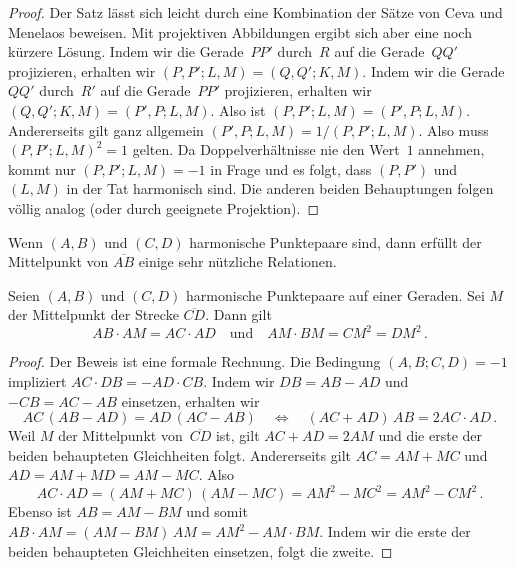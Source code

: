 \begin{proof}
	Der Satz lässt sich leicht durch eine Kombination der Sätze von Ceva und Menelaos beweisen. Mit projektiven Abbildungen ergibt sich aber eine noch kürzere Lösung. Indem wir die Gerade~$PP'$ durch~$R$ auf die Gerade~$QQ'$ projizieren, erhalten wir $(P,P';L,M)=(Q,Q';K,M)$. Indem wir die Gerade~$QQ'$ durch~$R'$ auf die Gerade~$PP'$ projizieren, erhalten wir $(Q,Q';K,M)=(P',P;L,M)$. Also ist $(P,P';L,M)=(P',P;L,M)$. Andererseits gilt ganz allgemein $(P',P;L,M)=1/(P,P';L,M)$. Also muss $(P,P';L,M)^2=1$ gelten. Da Doppelverhältnisse nie den Wert~$1$ annehmen, kommt nur $(P,P';L,M)=-1$ in Frage und es folgt, dass $(P,P')$ und $(L,M)$ in der Tat harmonisch sind. Die anderen beiden Behauptungen folgen völlig analog (oder durch geeignete Projektion).
\end{proof}

Wenn $(A,B)$ und $(C,D)$ harmonische Punktepaare sind, dann erfüllt der Mittelpunkt von $\overline{AB}$ einige sehr nützliche Relationen.

\begin{satzmitnamen}[Lemma]
	Seien $(A,B)$ und $(C,D)$ harmonische Punktepaare auf einer Geraden. Sei $M$ der Mittelpunkt der Strecke $\overline{CD}$. Dann gilt 
	\begin{equation*}
		AB\cdot AM=AC\cdot AD\quad\text{und}\quad AM\cdot BM=CM^2=DM^2\,.
	\end{equation*}
\end{satzmitnamen}

\begin{proof}
	Der Beweis ist eine formale Rechnung. Die Bedingung $(A,B;C,D)=-1$ impliziert $AC\cdot DB=-AD\cdot CB$. Indem wir $DB=AB-AD$ und $-CB=AC-AB$ einsetzen, erhalten wir
	\begin{equation*}
		AC\,(AB-AD)=AD\,(AC-AB)\quad\iff\quad (AC+AD)\,AB=2AC\cdot AD\,.
	\end{equation*}
	Weil $M$ der Mittelpunkt von~$\overline{CD}$ ist, gilt $AC+AD=2AM$ und die erste der beiden behaupteten Gleichheiten folgt. Andererseits gilt $AC=AM+MC$ und $AD=AM+MD=AM-MC$. Also
	\begin{equation*}
		AC\cdot AD=(AM+MC)\,(AM-MC)=AM^2-MC^2=AM^2-CM^2\,.
	\end{equation*}
	Ebenso ist $AB=AM-BM$ und somit $AB\cdot AM=(AM-BM)\,AM=AM^2-AM\cdot BM$. Indem wir die erste der beiden behaupteten Gleichheiten einsetzen, folgt die zweite.
\end{proof}

